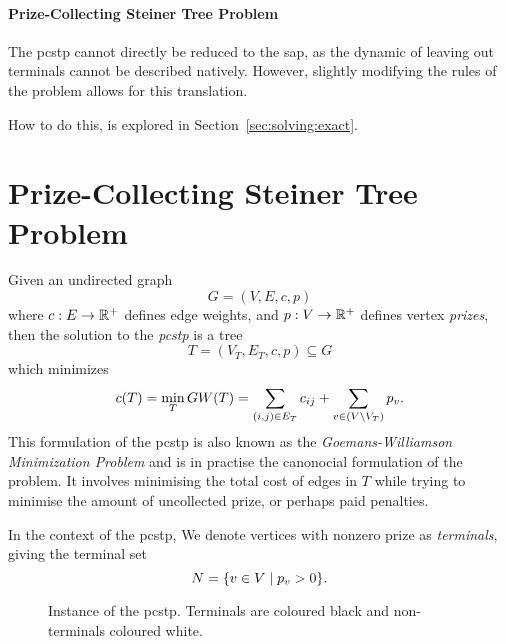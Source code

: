 \paragraph{Prize-Collecting Steiner Tree Problem}
The \gls{pcstp} cannot directly be reduced to the \gls{sap}, as the dynamic of leaving out
terminals cannot be described natively. However, slightly modifying the rules of the problem
allows for this translation.

How to do this, is explored in Section~\ref{sec:solving:exact}.
\section{Prize-Collecting Steiner Tree Problem}
\label{sec:pcstp}
Given an undirected graph
\[G = (V, E, c, p)\]
where $c: E \to \mathbb{R}^+$ defines edge weights,
and $p: V \to \mathbb{R}^+$ defines vertex \textit{prizes}, then the solution to the
\textit{\gls{pcstp}} is a tree
\[T = (V_T, E_T, c, p) \subseteq G\]
which minimizes
\[c(T) = \min_T GW(T) = \sum_{(i,j) \in E_T} c_{ij} + \sum_{v\in (V \setminus V_T)} p_v \textnormal{.} \]
This formulation of the \gls{pcstp} is also known as the {\textit{Goemans-Williamson Minimization Problem}} and
is in practise the canonocial formulation of the problem. It involves minimising
 the total cost of edges in $T$ while trying to minimise the amount of uncollected prize, or perhaps paid penalties.

In the context of the \gls{pcstp}, We denote vertices with nonzero prize as \textit{terminals}, giving the terminal set
\[N = \{v \in V \mid p_v > 0\}\mathnormal{.}\]

\begin{figure}[h]\centering
{}
\caption{Instance of the \gls{pcstp}. Terminals are coloured black and non-terminals coloured white.}
\label{fig:pcstp:01}
\end{figure}

